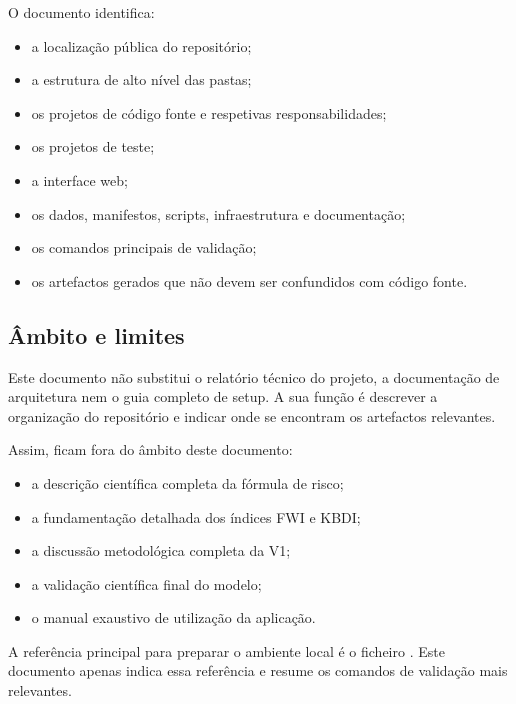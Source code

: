 O documento identifica:

\begin{itemize}
    \item a localização pública do repositório;
    \item a estrutura de alto nível das pastas;
    \item os projetos de código fonte e respetivas responsabilidades;
    \item os projetos de teste;
    \item a interface web;
    \item os dados, manifestos, scripts, infraestrutura e documentação;
    \item os comandos principais de validação;
    \item os artefactos gerados que não devem ser confundidos com código fonte.
\end{itemize}

\subsection{Âmbito e limites}

Este documento não substitui o relatório técnico do projeto, a documentação de arquitetura nem o guia completo de setup. A sua função é descrever a organização do repositório e indicar onde se encontram os artefactos relevantes.

Assim, ficam fora do âmbito deste documento:

\begin{itemize}
    \item a descrição científica completa da fórmula de risco;
    \item a fundamentação detalhada dos índices FWI e KBDI;
    \item a discussão metodológica completa da V1;
    \item a validação científica final do modelo;
    \item o manual exaustivo de utilização da aplicação.
\end{itemize}

A referência principal para preparar o ambiente local é o ficheiro . Este documento apenas indica essa referência e resume os comandos de validação mais relevantes.
